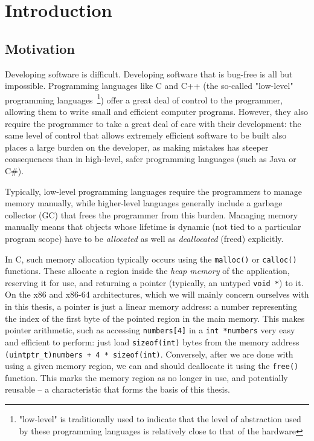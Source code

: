 \chapter{Introduction}
\label{ch:intro}


\section{Motivation}

Developing software is difficult. Developing software that is bug-free is all but impossible. Programming languages like C and C++ (the so-called "low-level" programming languages~\footnote{"low-level" is traditionally used to indicate that the level of abstraction used by these  programming languages is relatively close to that of the hardware}) offer a great deal of control to the programmer, allowing them to write small and efficient computer programs. However, they also require the programmer to take a great deal of care with their development: the same level of control that allows extremely efficient software to be built also places a large burden on the developer, as making mistakes has steeper consequences than in high-level, safer programming languages (such as Java or C\#).

Typically, low-level programming languages require the programmers to manage memory manually, while higher-level languages generally include a garbage collector (GC) that frees the programmer from this burden. Managing memory manually means that objects whose lifetime is dynamic (not tied to a particular program scope) have to be \emph{allocated} as well as \emph{deallocated} (freed) explicitly.

In C, such memory allocation typically occurs using the \lstinline!malloc()! or \lstinline!calloc()! functions. These allocate a region inside the \emph{heap memory} of the application, reserving it for use, and returning a pointer (typically, an untyped \lstinline!void *!) to it. On the x86 and x86-64 architectures, which we will mainly concern ourselves with in this thesis, a pointer is just a linear memory address: a number representing the index of the first byte of the pointed region in the main memory. This makes pointer arithmetic, such as accessing \lstinline!numbers[4]! in a \lstinline!int *numbers! very easy and efficient to perform: just load \lstinline!sizeof(int)! bytes from the memory address \lstinline!(uintptr_t)numbers + 4 * sizeof(int)!. Conversely, after we are done with using a given memory region, we can and should deallocate it using the \lstinline!free()! function. This marks the memory region as no longer in use, and potentially reusable -- a characteristic that forms the basis of this thesis.

